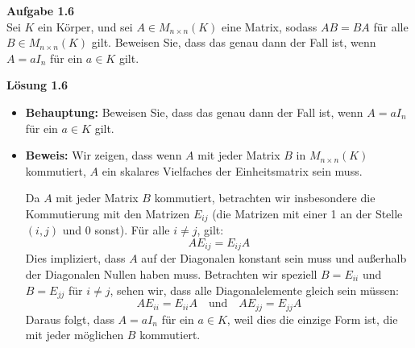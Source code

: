 \documentclass[%
    12pt,
    a4paper,
    ngerman,
    headheight=29.1pt,
]{scrartcl}
\newcommand{\Aufgabe}[1]{
  {
  \vspace*{0.5cm}
  \textsf{\textbf{Aufgabe #1}}
  \vspace*{0.2cm}
  }
}
\newcommand{\Loesung}[1]{
  {
  \vspace*{0.5cm}
  \textsf{\textbf{Lösung #1}}
  \vspace*{0.2cm}
  }
}
\begin{document}
\Aufgabe{1.6} \\
Sei \( K \) ein Körper, und sei \( A \in M_{n \times n}(K) \) eine Matrix, sodass \( AB = BA \) für alle \( B \in M_{n \times n}(K) \) gilt. Beweisen Sie, dass das genau dann der Fall ist, wenn \( A = aI_n \) für ein \( a \in K \) gilt.

\Loesung{1.6}\\
\begin{itemize}
    \item \textbf{Behauptung:}
    Beweisen Sie, dass das genau dann der Fall ist, wenn \( A = aI_n \) für ein \( a \in K \) gilt.
    
    \item \textbf{Beweis:}
    Wir zeigen, dass wenn \( A \) mit jeder Matrix \( B \) in \( M_{n \times n}(K) \) kommutiert, \( A \) ein skalares Vielfaches der Einheitsmatrix sein muss.

    Da \( A \) mit jeder Matrix \( B \) kommutiert, betrachten wir insbesondere die Kommutierung mit den Matrizen \( E_{ij} \) (die Matrizen mit einer 1 an der Stelle \( (i, j) \) und 0 sonst). Für alle \( i \neq j \), gilt:
    \[
    AE_{ij} = E_{ij}A
    \]
    Dies impliziert, dass \( A \) auf der Diagonalen konstant sein muss und außerhalb der Diagonalen Nullen haben muss. Betrachten wir speziell \( B = E_{ii} \) und \( B = E_{jj} \) für \( i \neq j \), sehen wir, dass alle Diagonalelemente gleich sein müssen:
    \[
    AE_{ii} = E_{ii}A \quad \text{und} \quad AE_{jj} = E_{jj}A
    \]
    Daraus folgt, dass \( A = aI_n \) für ein \( a \in K \), weil dies die einzige Form ist, die mit jeder möglichen \( B \) kommutiert.
\end{itemize}

\end{document}
